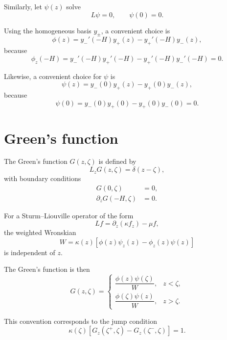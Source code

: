 \documentclass[10pt]{amsart}
\begin{document}
Similarly, let \(\psi(z)\) solve
\begin{equation}
L\psi=0,
\qquad
\psi(0)=0.
\label{eq:psi_def}
\end{equation}

Using the homogeneous basis \(y_\pm\), a convenient choice is
\begin{equation}
\phi(z)
=
y_-'(-H)y_+(z)-y_+'(-H)y_-(z),
\label{eq:phi_explicit}
\end{equation}
because
\[
\phi_z(-H)
=
y_-'(-H)y_+'(-H)-y_+'(-H)y_-'(-H)
=
0.
\]

Likewise, a convenient choice for \(\psi\) is
\begin{equation}
\psi(z)
=
y_-(0)y_+(z)-y_+(0)y_-(z),
\label{eq:psi_explicit}
\end{equation}
because
\[
\psi(0)
=
y_-(0)y_+(0)-y_+(0)y_-(0)
=
0.
\]

\section{Green's function}

The Green's function \(G(z,\zeta)\) is defined by
\begin{equation}
L_z G(z,\zeta)=\delta(z-\zeta),
\label{eq:green_def}
\end{equation}
with boundary conditions
\begin{align}
G(0,\zeta)&=0,\\
\partial_z G(-H,\zeta)&=0.
\end{align}

For a Sturm--Liouville operator of the form
\[
L f = \partial_z(\kappa f_z)-\mu f,
\]
the weighted Wronskian
\begin{equation}
W
=
\kappa(z)
\left[
\phi(z)\psi_z(z)-\phi_z(z)\psi(z)
\right]
\label{eq:wronskian}
\end{equation}
is independent of \(z\).

The Green's function is then
\begin{equation}
G(z,\zeta)
=
\begin{cases}
\dfrac{\phi(z)\psi(\zeta)}{W},
& z<\zeta,\\[1.2em]
\dfrac{\phi(\zeta)\psi(z)}{W},
& z>\zeta.
\end{cases}
\label{eq:green}
\end{equation}

This convention corresponds to the jump condition
\begin{equation}
\kappa(\zeta)
\left[
G_z(\zeta^+,\zeta)-G_z(\zeta^-,\zeta)
\right]
=1.
\end{equation}
\end{document}
